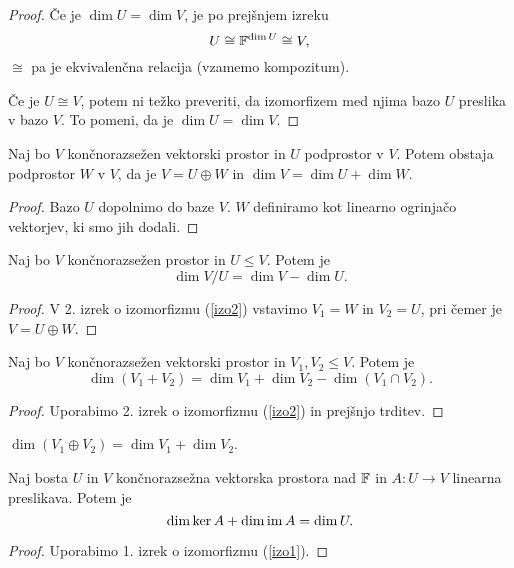 \documentclass[12pt, a4paper]{article}
\begin{document}
\begin{proof}
Če je $\dim U=\dim V$, je po prejšnjem izreku
\[
U\cong \mathbb{F}^{\dim U}\cong V,
\]
$\cong$ pa je ekvivalenčna relacija (vzamemo kompozitum).

Če je $U\cong V$, potem ni težko preveriti, da izomorfizem med njima bazo $U$ preslika v bazo $V$. To pomeni, da je $\dim U=\dim V$.
\end{proof}

\begin{trditev}
Naj bo $V$ končnorazsežen vektorski prostor in $U$ podprostor v $V$. Potem obstaja podprostor $W$ v $V$, da je $V=U\oplus W$ in $\dim V=\dim U+\dim W$.
\end{trditev}

\begin{proof}
Bazo $U$ dopolnimo do baze $V$. $W$ definiramo kot linearno ogrinjačo vektorjev, ki smo jih dodali.
\end{proof}

\begin{trditev}
Naj bo $V$ končnorazsežen prostor in $U\leq V$. Potem je
\[
\dim V/U=\dim V-\dim U.
\]
\end{trditev}

\begin{proof}
V 2. izrek o izomorfizmu (\ref{izo2}) vstavimo $V_1=W$ in $V_2=U$, pri čemer je $V=U\oplus W$.
\end{proof}

\begin{trditev}
Naj bo $V$ končnorazsežen vektorski prostor in $V_1,V_2\leq V$. Potem je
\[
\dim(V_1+V_2)=\dim V_1+\dim V_2-\dim(V_1\cap V_2).
\]
\end{trditev}

\begin{proof}
Uporabimo 2. izrek o izomorfizmu (\ref{izo2}) in prejšnjo trditev.
\end{proof}

\begin{posledica}
$\dim(V_1\oplus V_2)=\dim V_1+\dim V_2$.
\end{posledica}

\begin{trditev}
Naj bosta $U$ in $V$ končnorazsežna vektorska prostora nad $\mathbb{F}$ in $A\colon U\to V$ linearna preslikava. Potem je
\[
\dim\ker A+\dim\operatorname{im} A=\dim U.
\]
\end{trditev}

\begin{proof}
Uporabimo 1. izrek o izomorfizmu (\ref{izo1}).
\end{proof}
\end{document}
